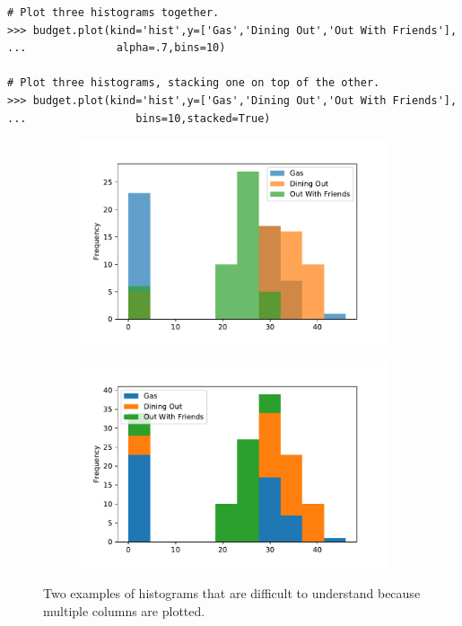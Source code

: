 \begin{lstlisting}
# Plot three histograms together.
>>> budget.plot(kind='hist',y=['Gas','Dining Out','Out With Friends'],
...		   	     alpha=.7,bins=10)

# Plot three histograms, stacking one on top of the other.
>>> budget.plot(kind='hist',y=['Gas','Dining Out','Out With Friends'],
...		    	    bins=10,stacked=True)
\end{lstlisting}

\begin{figure}[H] %
\centering
\begin{subfigure}{.49\textwidth}
    \includegraphics[width=\textwidth]{figures/bad_hist_unstacked.pdf}
\end{subfigure}
%
\begin{subfigure}{.49\textwidth}
    \includegraphics[width=\textwidth]{figures/bad_hist_stacked.pdf}
\end{subfigure}
\caption{Two examples of histograms that are difficult to understand because multiple columns are plotted.}
\end{figure}

